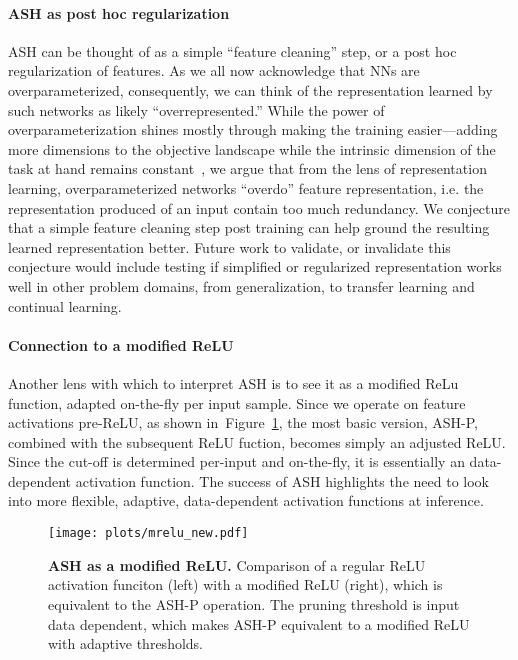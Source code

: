 \documentclass{article}
\newcommand{\figlabel}[1]{\label{fig:#1}}
\newcommand{\figref}[1]{Figure~\ref{fig:#1}}
\begin{document}
\paragraph{ASH as post hoc regularization} ASH can be thought of as a simple ``feature cleaning'' step, or a post hoc regularization of features.
As we all now acknowledge that NNs are overparameterized, consequently, we can think of the representation learned by such networks as likely ``overrepresented.'' While the power of overparameterization shines mostly through making the training easier—adding more dimensions to the objective landscape while the intrinsic dimension of the task at hand remains constant~\citep{LiFLY18}, we argue that from the lens of representation learning, overparameterized networks ``overdo'' feature representation, i.e. the representation produced of an input contain too much redundancy. We  conjecture that a simple feature cleaning step post training can help ground the resulting learned representation better. Future work to validate, or invalidate this conjecture would include testing if simplified or regularized representation works well in other problem domains, from generalization, to transfer learning and continual learning.





\paragraph{Connection to a modified ReLU} Another lens with which to interpret ASH is to see it as a modified ReLu function, adapted on-the-fly per input sample. Since we operate on feature activations pre-ReLU, as shown in~\figref{mrelu}, the most basic version, ASH-P, combined with the subsequent ReLU fuction, becomes simply an adjusted ReLU. Since the cut-off is determined per-input and on-the-fly, it is essentially an data-dependent activation function. The success of ASH highlights the need to look into more flexible, adaptive, data-dependent activation functions at inference. 

\begin{figure}[hbt!]
    \centering 
	\texttt{[image: plots/mrelu\_new.pdf]}
	\caption{\textbf{ASH as a modified ReLU.} Comparison of a regular ReLU activation funciton (left) with a modified ReLU (right), which is equivalent to the ASH-P operation. The pruning threshold  is input data dependent, which makes ASH-P equivalent to a modified ReLU with adaptive thresholds.}
	\figlabel{mrelu}
\end{figure}
\end{document}
